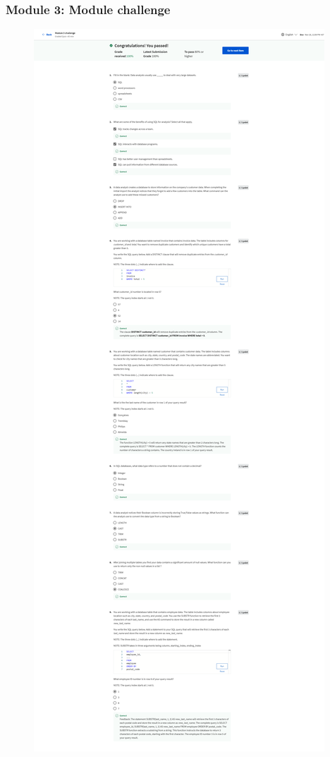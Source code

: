 \documentclass[]{article}
\begin{document}
\subsubsection{Module 3: Module challenge}

\begin{figure}
  \centering
  \includegraphics[height=\textheight,keepaspectratio]{image/module_3.png}
\end{figure}
\end{document}
